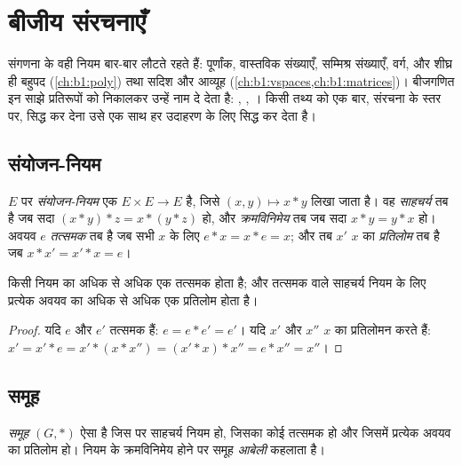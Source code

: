 \chapter{बीजीय संरचनाएँ}\label{ch:b1:structures}

संगणना के वही नियम बार-बार लौटते रहते हैं: पूर्णांक, वास्तविक संख्याएँ,
सम्मिश्र संख्याएँ,  वर्ग, और शीघ्र ही बहुपद (\cref{ch:b1:poly})
तथा सदिश और आव्यूह (\cref{ch:b1:vspaces,ch:b1:matrices})। बीजगणित इन साझे
प्रतिरूपों को निकालकर उन्हें नाम दे देता है: \emph{}, \emph{},
\emph{}। किसी तथ्य को एक बार, संरचना के स्तर पर, सिद्ध कर देना उसे एक
साथ हर उदाहरण के लिए सिद्ध कर देता है।

\section{संयोजन-नियम}

\begin{definition}\label{def:b1:structures:law}
 $E$ पर \emph{संयोजन-नियम} एक  $E
\times E \to E$ है, जिसे $(x, y) \mapsto x * y$ लिखा जाता है। वह
\emph{साहचर्य} तब है जब सदा $(x*y)*z = x*(y*z)$ हो, और \emph{क्रमविनिमेय} तब
जब सदा $x * y = y * x$ हो। अवयव $e$ \emph{तत्समक} तब है जब सभी $x$ के लिए $e
* x = x * e = x$; और तब $x'$ $x$ का \emph{प्रतिलोम} तब है जब $x * x' = x' *
x = e$।
\end{definition}

\begin{proposition}[अद्वितीयता]\label{prop:b1:structures:unique}
किसी नियम का अधिक से अधिक एक तत्समक होता है; और तत्समक वाले साहचर्य नियम के
लिए प्रत्येक अवयव का अधिक से अधिक एक प्रतिलोम होता है।
\end{proposition}

\begin{proof}
यदि $e$ और $e'$ तत्समक हैं: $e = e * e' = e'$। यदि $x'$ और $x''$ $x$ का
प्रतिलोमन करते हैं: $x' = x' * e = x' * (x * x'') = (x' * x) * x'' = e * x''
= x''$।
\end{proof}

\section{समूह}

\begin{definition}[समूह]\label{def:b1:structures:group}
\emph{समूह} $(G, *)$ ऐसा  है जिस पर साहचर्य नियम हो,
जिसका कोई तत्समक हो और जिसमें प्रत्येक अवयव का प्रतिलोम हो। नियम के
क्रमविनिमेय होने पर समूह \emph{आबेली} कहलाता है।
\end{definition}


